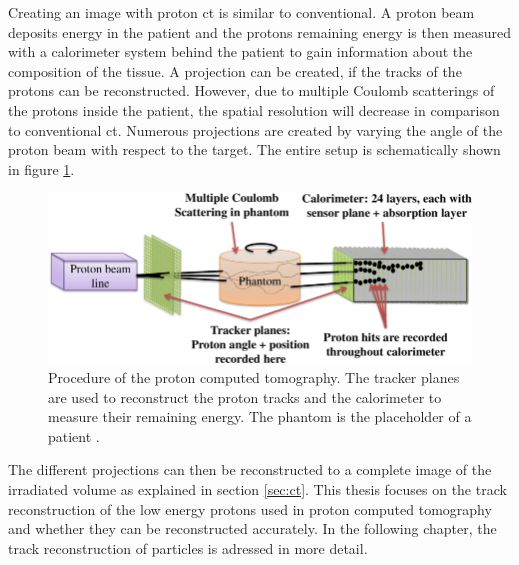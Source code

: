 Creating an image with proton ct is similar to conventional. A proton beam deposits energy in the patient and the
protons remaining energy is then measured with a calorimeter system behind the patient to gain information about the composition of the tissue. A projection can be created,
if the tracks of the protons can be reconstructed. However, due to multiple Coulomb scatterings of the protons inside the patient, the spatial resolution will decrease in comparison
to conventional ct. Numerous projections are created by varying the angle of the proton beam with respect to the target. The entire setup is schematically shown in figure \ref{fig:proton_ct}.

\begin{figure}
  \centering
  \includegraphics[height=0.4\textwidth]{images/proton_ct.png}
  \caption{Procedure of the proton computed tomography. The tracker planes are used to reconstruct the proton tracks and the calorimeter to measure their remaining energy.
  The phantom is the placeholder of a patient \cite{proton_ct}.}
  \label{fig:proton_ct}
\end{figure}

The different projections can then be reconstructed to a complete image of the irradiated volume as explained in section \ref{sec:ct}.
This thesis focuses on the track reconstruction of the low energy protons used in proton computed tomography and whether they can be reconstructed accurately.
In the following chapter, the track reconstruction of particles is adressed in more detail.
